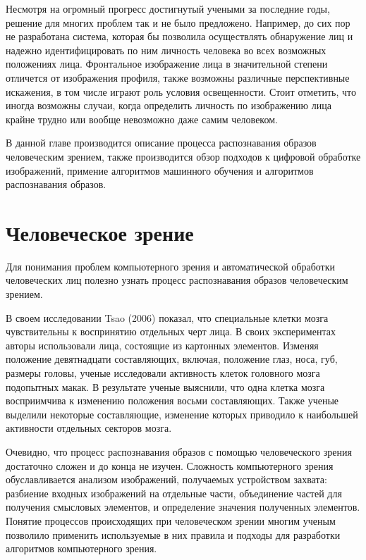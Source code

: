 Несмотря на огромный прогресс достигнутый учеными за последние годы, решение для многих проблем так и не было предложено. Например, до сих пор не разработана система, которая бы позволила осуществлять обнаружение лиц и надежно идентифицировать по ним личность человека во всех возможных положениях лица. Фронтальное изображение лица в значительной степени отличется от изображения профиля, также возможны различные перспективные искажения, в том числе играют роль условия освещенности. Стоит отметить, что иногда возможны случаи, когда определить личность по изображению лица крайне трудно или вообще невозможно даже самим человеком.



В данной главе производится описание процесса распознавания образов человеческим зрением, также производится обзор подходов к цифровой обработке изображений, примение алгоритмов машинного обучения и алгоритмов распознавания образов.

\section{Человеческое зрение}
Для понимания проблем компьютерного зрения и автоматической обработки человеческих лиц полезно узнать процесс распознавания образов человеческим зрением.

В своем исследовании Tsao (2006) показал, что специальные клетки мозга чувствительны к воспринятию отдельных черт лица. В своих экспериментах авторы использовали лица, состоящие из картонных элементов. Изменяя положение девятнадцати составляющих, включая, положение глаз, носа, губ, размеры головы, ученые исследовали активность клеток головного мозга подопытных макак. В результате ученые выяснили, что одна клетка мозга восприимчива к изменению положения восьми составляющих. Также ученые выделили некоторые составляющие, изменение которых приводило к наибольшей активности отдельных секторов мозга.

\begin{figure}
\label{}
\end{figure}

Очевидно, что процесс распознавания образов с помощью человеческого зрения достаточно сложен и до конца не изучен. Сложность компьютерного зрения обуславливается анализом изображений, получаемых устройством захвата: разбиение входных изображений на отдельные части, объединение частей для получения смысловых элементов, и определение значения полученных элементов. Понятие процессов происходящих при человеческом зрении многим ученым позволило применить используемые в них правила и подходы для разработки алгоритмов компьютерного зрения.

